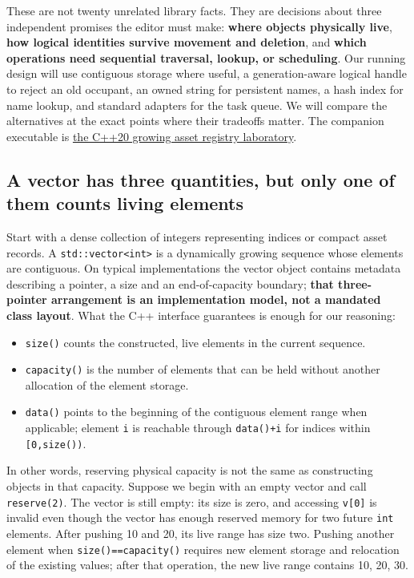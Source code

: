 These are not twenty unrelated library facts. They are decisions about three independent promises the editor must make: \textbf{where objects physically live}, \textbf{how logical identities survive movement and deletion}, and \textbf{which operations need sequential traversal, lookup, or scheduling}. Our running design will use contiguous storage where useful, a generation-aware logical handle to reject an old occupant, an owned string for persistent names, a hash index for name lookup, and standard adapters for the task queue. We will compare the alternatives at the exact points where their tradeoffs matter. The companion executable is \hyperref[source-file-e829cf731b17419e282775cf]{the C++20 growing asset registry laboratory}.

\subsection{A vector has three quantities, but only one of them counts living elements}\label{01-foundations-i-ch006-a-vector-has-three-quantities-but-only-one-of-them-counts-living-elements}

Start with a dense collection of integers representing indices or compact asset records. A \texttt{std::vector\textless{}int\textgreater{}} is a dynamically growing sequence whose elements are contiguous. On typical implementations the vector object contains metadata describing a pointer, a size and an end-of-capacity boundary; \textbf{that three-pointer arrangement is an implementation model, not a mandated class layout}. What the C++ interface guarantees is enough for our reasoning:

\begin{itemize}
\tightlist
\item
  \texttt{size()} counts the constructed, live elements in the current sequence.
\item
  \texttt{capacity()} is the number of elements that can be held without another allocation of the element storage.
\item
  \texttt{data()} points to the beginning of the contiguous element range when applicable; element \texttt{i} is reachable through \texttt{data()+i} for indices within \texttt{{[}0,size())}.
\end{itemize}

In other words, reserving physical capacity is not the same as constructing objects in that capacity. Suppose we begin with an empty vector and call \texttt{reserve(2)}. The vector is still empty: its size is zero, and accessing \texttt{v{[}0{]}} is invalid even though the vector has enough reserved memory for two future \texttt{int} elements. After pushing 10 and 20, its live range has size two. Pushing another element when \texttt{size()==capacity()} requires new element storage and relocation of the existing values; after that operation, the new live range contains 10, 20, 30.

